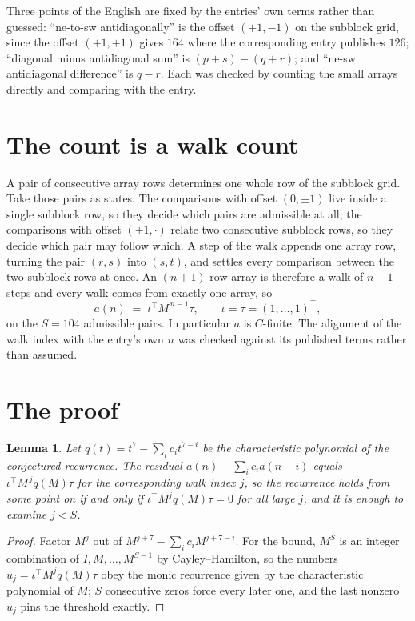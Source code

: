 \documentclass[11pt,a4paper]{article}
\theoremstyle{plain}
\newtheorem{lemma}[theorem]{Lemma}
\theoremstyle{definition}
\begin{document}
Three points of the English are fixed by the entries' own terms rather than guessed:
``ne-to-sw antidiagonally'' is the offset $(+1,-1)$ on the subblock grid, since the offset
$(+1,+1)$ gives $164$ where the corresponding entry publishes $126$; ``diagonal minus
antidiagonal sum'' is $(p+s)-(q+r)$; and ``ne-sw antidiagonal difference'' is $q-r$. Each was
checked by counting the small arrays directly and comparing with the entry.

\section{The count is a walk count}

A pair of consecutive array rows determines one whole row of the subblock grid. Take those
pairs as states. The comparisons with offset $(0,\pm1)$ live inside a single subblock row, so
they decide which pairs are admissible at all; the comparisons with offset $(\pm1,\cdot)$
relate two consecutive subblock rows, so they decide which pair may follow which. A step of the
walk appends one array row, turning the pair $(r,s)$ into $(s,t)$, and settles every comparison
between the two subblock rows at once. An $(n+1)$-row array is therefore a walk of $n-1$ steps
and every walk comes from exactly one array, so
\[
a(n)\;=\;\iota^{\!\top}M^{\,n-1}\tau,\qquad \iota=\tau=(1,\dots,1)^{\!\top},
\]
on the $S=104$ admissible pairs. In particular $a$ is $C$-finite. The alignment of the walk
index with the entry's own $n$ was checked against its published terms rather than assumed.

\section{The proof}

\begin{lemma}\label{lem:crit}
Let $q(t)=t^{7}-\sum_i c_it^{7-i}$ be the characteristic polynomial of the
conjectured recurrence. The residual $a(n)-\sum_ic_ia(n-i)$ equals
$\iota^{\!\top}M^{\,j}q(M)\tau$ for the corresponding walk index $j$, so the recurrence
holds from some point on if and only if $\iota^{\!\top}M^{j}q(M)\tau=0$ for all large $j$,
and it is enough to examine $j<S$.
\end{lemma}

\begin{proof}
Factor $M^{j}$ out of $M^{j+7}-\sum_ic_iM^{j+7-i}$. For the bound, $M^{S}$
is an integer combination of $I,M,\dots,M^{S-1}$ by Cayley--Hamilton, so the numbers
$u_j=\iota^{\!\top}M^{j}q(M)\tau$ obey the monic recurrence given by the characteristic
polynomial of $M$; $S$ consecutive zeros force every later one, and the last nonzero $u_j$
pins the threshold exactly.
\end{proof}
\end{document}
